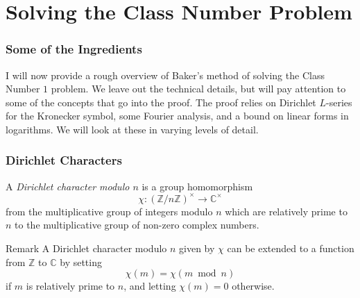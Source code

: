 \documentclass{beamer}
\begin{document}
\section{Solving the Class Number Problem}

\begin{frame}

	\frametitle{Some of the Ingredients}

	I will now provide a rough overview of Baker's method of solving the Class Number $1$ problem. We leave out the technical details, but will pay attention to some of the concepts that go into the proof. The proof relies on Dirichlet $L$-series for the Kronecker symbol, some Fourier analysis, and a bound on linear forms in logarithms. We will look at these in varying levels of detail.

\end{frame}

\begin{frame}

	\frametitle{Dirichlet Characters}

	\begin{definition}
		A \emph{Dirichlet character modulo $n$} is a group homomorphism
		\[
			\chi : {\left(\mathbb{Z} / n \mathbb{Z}\right)}^\times \to {\mathbb{C}}^\times
		\]
		from the multiplicative group of integers modulo $n$ which are relatively prime to $n$ to the multiplicative group of non-zero complex numbers.
	\end{definition}

	\begin{block}{Remark}
		A Dirichlet character modulo $n$ given by $\chi$ can be extended to a function from $\mathbb{Z}$ to $\mathbb{C}$ by setting
		\[
			\chi(m) = \chi(m \bmod n)
		\]
		if $m$ is relatively prime to $n$, and letting $\chi(m) = 0$ otherwise.
	\end{block}

\end{frame}
\end{document}
